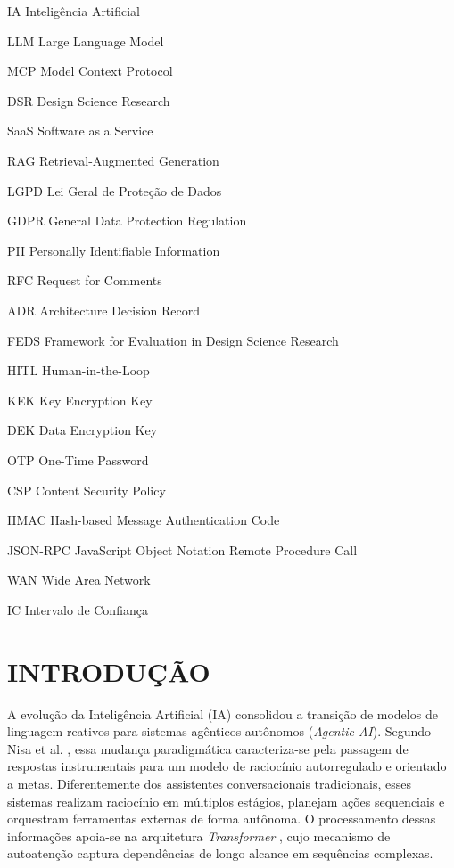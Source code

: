 \documentclass[12pt,openright,twoside,a4paper,english,brazil]{abntex2}
\begin{document}
\begin{siglas}
\item[IA] Inteligência Artificial
\item[LLM] Large Language Model
\item[MCP] Model Context Protocol
\item[DSR] Design Science Research
\item[SaaS] Software as a Service
\item[RAG] Retrieval-Augmented Generation
\item[LGPD] Lei Geral de Proteção de Dados
\item[GDPR] General Data Protection Regulation
\item[PII] Personally Identifiable Information
\item[RFC] Request for Comments
\item[ADR] Architecture Decision Record
\item[FEDS] Framework for Evaluation in Design Science Research
\item[HITL] Human-in-the-Loop
\item[KEK] Key Encryption Key
\item[DEK] Data Encryption Key
\item[OTP] One-Time Password
\item[CSP] Content Security Policy
\item[HMAC] Hash-based Message Authentication Code
\item[JSON-RPC] JavaScript Object Notation Remote Procedure Call
\item[WAN] Wide Area Network
\item[IC] Intervalo de Confiança
\end{siglas}
\tableofcontents*
\textual

\chapter{INTRODUÇÃO}
A evolução da Inteligência Artificial (IA) consolidou a transição de modelos de linguagem reativos para sistemas agênticos autônomos (\textit{Agentic AI}). Segundo Nisa et al. \cite{nisa2025}, essa mudança paradigmática caracteriza-se pela passagem de respostas instrumentais para um modelo de raciocínio autorregulado e orientado a metas. Diferentemente dos assistentes conversacionais tradicionais, esses sistemas realizam raciocínio em múltiplos estágios, planejam ações sequenciais e orquestram ferramentas externas de forma autônoma. O processamento dessas informações apoia-se na arquitetura \textit{Transformer} \cite{vaswani2017}, cujo mecanismo de autoatenção captura dependências de longo alcance em sequências complexas.
\end{document}
